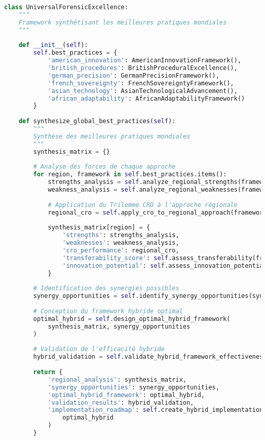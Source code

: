 \begin{lstlisting}[language=Python, caption=Framework d'excellence forensique universelle]
class UniversalForensicExcellence:
    """
    Framework synthétisant les meilleures pratiques mondiales
    """
    
    def __init__(self):
        self.best_practices = {
            'american_innovation': AmericanInnovationFramework(),
            'british_procedures': BritishProceduralExcellence(),
            'german_precision': GermanPrecisionFramework(),
            'french_sovereignty': FrenchSovereigntyFramework(),
            'asian_technology': AsianTechnologicalAdvancement(),
            'african_adaptability': AfricanAdaptabilityFramework()
        }
        
    def synthesize_global_best_practices(self):
        """
        Synthèse des meilleures pratiques mondiales
        """
        synthesis_matrix = {}
        
        # Analyse des forces de chaque approche
        for region, framework in self.best_practices.items():
            strengths_analysis = self.analyze_regional_strengths(framework)
            weakness_analysis = self.analyze_regional_weaknesses(framework)
            
            # Application du Trilemme CRO à l'approche régionale
            regional_cro = self.apply_cro_to_regional_approach(framework)
            
            synthesis_matrix[region] = {
                'strengths': strengths_analysis,
                'weaknesses': weakness_analysis,
                'cro_performance': regional_cro,
                'transferability_score': self.assess_transferability(framework),
                'innovation_potential': self.assess_innovation_potential(framework)
            }
            
        # Identification des synergies possibles
        synergy_opportunities = self.identify_synergy_opportunities(synthesis_matrix)
        
        # Conception du framework hybride optimal
        optimal_hybrid = self.design_optimal_hybrid_framework(
            synthesis_matrix, synergy_opportunities
        )
        
        # Validation de l'efficacité hybride
        hybrid_validation = self.validate_hybrid_framework_effectiveness(optimal_hybrid)
        
        return {
            'regional_analysis': synthesis_matrix,
            'synergy_opportunities': synergy_opportunities,
            'optimal_hybrid_framework': optimal_hybrid,
            'validation_results': hybrid_validation,
            'implementation_roadmap': self.create_hybrid_implementation_roadmap(
                optimal_hybrid
            )
        }
    

\end{lstlisting}
